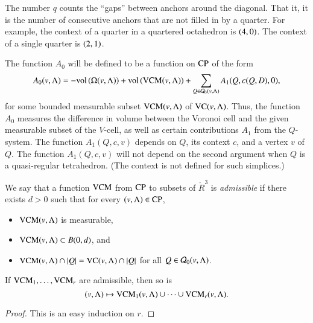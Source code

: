\begin{remark}
The number $q$ counts the ``gaps'' between anchors around the
diagonal. That it, it is the number of consecutive anchors that
are not filled in by a quarter.  For example, the context of a
quarter in a quartered octahedron is $\relax(4,0)$. The context of a
single quarter is $\relax(2,1)$.
\end{remark}

The function $A_0$ will be defined to be a function on ${\operatorname{CP}}$
of the form
  \begin{equation}
  A_0(v,\Lambda) = -{\operatorname{vol}}\,(\Omega(v,\Lambda)) + {\operatorname{vol}}\,({\operatorname{VCM}}(v,\Lambda)) +
   \sum_{Q\in{\mathcal Q}_0(v,\Lambda)} A_1(Q,c(Q,D),0),
   \label{eqn:A1}
   \end{equation}
for some bounded measurable subset ${\operatorname{VCM}}(v,\Lambda)$ of ${\operatorname{VC}}(v,\Lambda)$.
Thus, the function $A_0$ measures the difference in volume between
the Voronoi cell and the given measurable subset of the $V$-cell,
as well as certain contributions $A_1$ from the $Q$-system. The
function $A_1(Q,c,v)$ depends on $Q$, its context $c$, and a
vertex $v$ of $Q$.  The function $A_1(Q,c,v)$ will not depend on
the second argument when $Q$ is a quasi-regular tetrahedron.  (The
context is not defined for such simplices.)

\begin{definition}\label{def:vcm-admiss}  We say that a function ${\operatorname{VCM}}$ from
${\operatorname{CP}}$ to subsets of $\ring{R}^3$ is {\it admissible} if
 there exists $d>0$ such that for every
$(v,\Lambda)\in{\operatorname{CP}}$,
    \begin{itemize}
        \item ${\operatorname{VCM}}(v,\Lambda)$ is measurable,
        \item ${\operatorname{VCM}}(v,\Lambda)\subset B(0,d)$, and
        \item ${\operatorname{VCM}}(v,\Lambda)\cap |Q| = {\operatorname{VC}}(v,\Lambda)\cap |Q|$ for all
        $Q\in{\mathcal Q}_0(v,\Lambda)$.
    \end{itemize}
\end{definition}

\begin{lemma} If ${\operatorname{VCM}}_1,\ldots,{\operatorname{VCM}}_r$ are admissible,
then so is $$(v,\Lambda)\mapsto {\operatorname{VCM}}_1(v,\Lambda)\cup\cdots\cup {\operatorname{VCM}}_r(v,\Lambda).$$
\end{lemma}

\begin{proof} This is an easy induction on $r$.
\end{proof}

